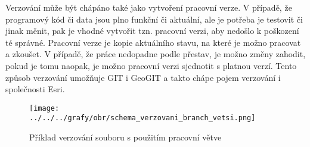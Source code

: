         Verzování může být chápáno také jako vytvoření pracovní verze. V případě, že
        programový kód či data jsou plno funkční či aktuální, ale je potřeba je
        testovit či jinak měnit, pak je vhodné vytvořit tzn. pracovní verzi, aby
        nedošlo k poškození té správné. Pracovní verze je kopie aktuálního stavu, na
        které je možno pracovat a zkoušet. V případě, že práce nedopadne podle přestav,
        je možno změny zahodit, pokud je tomu naopak, je možno pracovní verzi sjednotit
        s platnou verzí. Tento způsob verzování umožňuje GIT i GeoGIT a takto chápe
        pojem verzování i společnosti Esri.

          \begin{figure}[H]
            \centering
            \texttt{[image: ../../../grafy/obr/schema\_verzovani\_branch\_vetsi.png]}
            \caption {Příklad verzování souboru s použitím pracovní větve}
          \end{figure}

        

